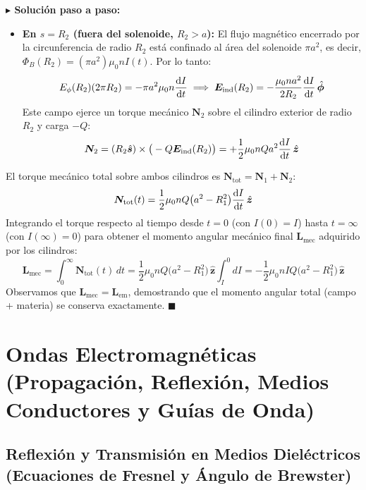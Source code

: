 \documentclass[11pt,a4paper]{book}
\newenvironment{solucion}{%
    \par\medskip\noindent\textbf{\color{blue!65!black}\Large $\blacktriangleright$ Solución paso a paso:}\par\medskip
}{%
    \hfill$\blacksquare$\par\bigskip
}
\newcommand{\phihat}{\hat{\bm{\phi}}}
\newcommand{\shat}{\hat{\bm{s}}}
\newcommand{\zhat}{\hat{\bm{z}}}
\newcommand{\Evec}{\bm{E}}
\begin{document}
\begin{solucion}
\begin{itemize}
    \item \textbf{En $s = R_2$ (fuera del solenoide, $R_2 > a$):} El flujo magnético encerrado por la circunferencia de radio $R_2$ está confinado al área del solenoide $\pi a^2$, es decir, $\Phi_B(R_2) = (\pi a^2) \mu_0 n I(t)$. Por lo tanto:
    \begin{equation}
        E_\phi(R_2) (2\pi R_2) = -\pi a^2 \mu_0 n \dv{I}{t} \implies \Evec_{\text{ind}}(R_2) = -\frac{\mu_0 n a^2}{2 R_2} \dv{I}{t}\,\phihat
    \end{equation}
    Este campo ejerce un torque mecánico $\bm{N}_2$ sobre el cilindro exterior de radio $R_2$ y carga $-Q$:
    \begin{equation}
        \bm{N}_2 = (R_2\shat) \times \big(-Q \Evec_{\text{ind}}(R_2)\big) = +\frac{1}{2}\mu_0 n Q a^2 \dv{I}{t}\,\zhat
    \end{equation}
\end{itemize}

El torque mecánico total sobre ambos cilindros es $\bm{N}_{\text{tot}} = \bm{N}_1 + \bm{N}_2$:
\begin{equation}
    \bm{N}_{\text{tot}}(t) = \frac{1}{2}\mu_0 n Q \big(a^2 - R_1^2\big) \dv{I}{t}\,\zhat
\end{equation}
Integrando el torque respecto al tiempo desde $t=0$ (con $I(0) = I$) hasta $t = \infty$ (con $I(\infty) = 0$) para obtener el momento angular mecánico final $\bm{L}_{\text{mec}}$ adquirido por los cilindros:
\begin{equation}
    \bm{L}_{\text{mec}} = \int_{0}^{\infty} \bm{N}_{\text{tot}}(t)\,dt = \frac{1}{2}\mu_0 n Q \big(a^2 - R_1^2\big)\,\zhat \int_{I}^{0} dI = -\frac{1}{2}\mu_0 n I Q \big(a^2 - R_1^2\big)\,\zhat
\end{equation}
Observamos que $\bm{L}_{\text{mec}} = \bm{L}_{\text{em}}$, demostrando que el momento angular total (campo + materia) se conserva exactamente.
\end{solucion}

\chapter[Ondas electromagnéticas]{Ondas Electromagnéticas (Propagación, Reflexión, Medios Conductores y Guías de Onda)}

\section[Reflexión y transmisión en dieléctricos]{Reflexión y Transmisión en Medios Dieléctricos (Ecuaciones de Fresnel y Ángulo de Brewster)}
\end{document}
